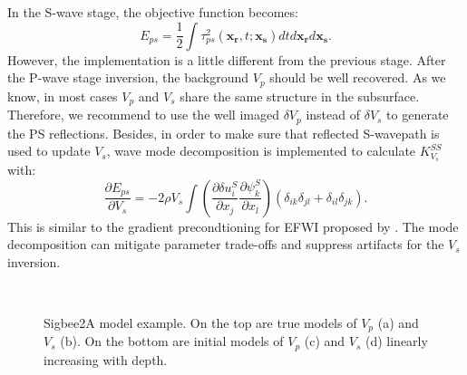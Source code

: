 In the S-wave stage, 
the objective function becomes:
\begin{equation}
	E_{ps}=\frac{1}{2}\int\tau^2_{ps}(\mathbf{x_r},t;\mathbf{x_s})dtd\mathbf{x_r}d\mathbf{x_s}.
    \label{eq:ObjectivefunctionPS} 
\end{equation}
However, the implementation is a little different from the previous stage. After the
P-wave stage inversion, the background $V_p$ should be well recovered. As we know, in
most cases $V_p$ and $V_s$ share the same structure in the subsurface. Therefore, we
recommend to use the well imaged $\delta V_p$ instead of $\delta V_s$ to generate the PS reflections. 
Besides, in order to make sure that reflected S-wavepath is used to update $V_s$, wave mode decomposition 
is implemented to calculate $K^{SS}_{V_s}$ with:
\begin{equation}
	\frac{\partial E_{ps}}{\partial V_s}=-2\rho V_s
	\int (\frac{\partial \delta u^S_{i}}{\partial
    x_j}\frac{\partial \psi^S_{k}}{\partial x_l})
	(\delta_{ik}\delta_{jl}+
	\delta_{il}\delta_{jk}).
    \label{eq:GradientVel_MD}
\end{equation}
This is similar to the gradient precondtioning for EFWI proposed by \cite{WangEtAl2017}. The mode
decomposition can mitigate parameter trade-offs and suppress artifacts for the
$V_s$ inversion.
\begin{figure}[!htb]
   \centering
   \\
   \caption{Sigbee2A model example. On the top are true models of 
   $V_p$ (a) and $V_s$ (b). On the bottom are initial models of $V_p$ (c) and $V_s$
   (d) linearly increasing with depth. }
   \label{fig:TrueAndInitial}
\end{figure}

